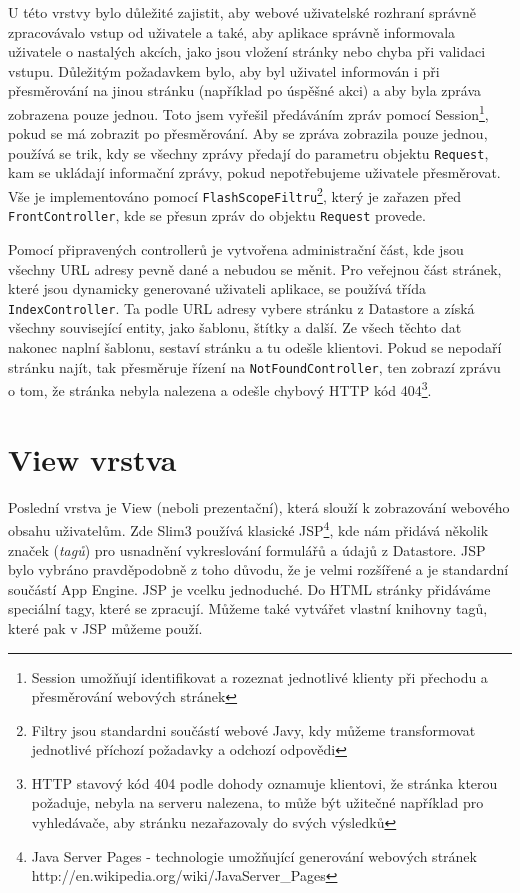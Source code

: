 U této vrstvy bylo důležité zajistit, aby webové uživatelské rozhraní správně zpracovávalo vstup od uživatele a také, aby aplikace správně informovala uživatele o nastalých akcích, jako jsou vložení stránky nebo chyba při validaci vstupu. Důležitým požadavkem bylo, aby byl uživatel informován i při přesměrování na jinou stránku (například po úspěšné akci) a aby byla zpráva zobrazena pouze jednou. Toto jsem vyřešil předáváním zpráv pomocí Session\footnote{Session umožňují identifikovat a rozeznat jednotlivé klienty při přechodu a přesměrování webových stránek}, pokud se má zobrazit po přesměrování. Aby se zpráva zobrazila pouze jednou, používá se trik, kdy se všechny zprávy předají do parametru objektu \verb|Request|, kam se ukládají informační zprávy, pokud nepotřebujeme uživatele přesměrovat. Vše je implementováno pomocí \verb|FlashScopeFiltru|\footnote{Filtry jsou standardni součástí webové Javy, kdy můžeme transformovat jednotlivé příchozí požadavky a odchozí odpovědi}, který je zařazen před \verb|FrontController|, kde se přesun zpráv do objektu \verb|Request| provede.

Pomocí připravených controllerů je vytvořena administrační část, kde jsou všechny URL adresy pevně dané a nebudou se měnit. Pro veřejnou část stránek, které jsou dynamicky generované uživateli aplikace, se používá třída \verb|IndexController|. Ta podle URL adresy vybere stránku z Datastore a získá všechny související entity, jako šablonu, štítky a další. Ze všech těchto dat nakonec naplní šablonu, sestaví stránku a tu odešle klientovi. Pokud se nepodaří stránku najít, tak přesměruje řízení na \verb|NotFoundController|, ten zobrazí zprávu o tom, že stránka nebyla nalezena a odešle chybový HTTP kód 404\footnote{HTTP stavový kód 404 podle dohody oznamuje klientovi, že stránka kterou požaduje, nebyla na serveru nalezena, to může být užitečné například pro vyhledávače, aby stránku nezařazovaly do svých výsledků}.

\section{View vrstva}
Poslední vrstva je View (neboli prezentační), která slouží k zobrazování webového obsahu uživatelům. Zde Slim3 používá klasické JSP\footnote{Java Server Pages - technologie umožňující generování webových stránek http://en.wikipedia.org/wiki/JavaServer\_Pages}, kde nám přidává několik značek (\emph{tagů}) pro usnadnění vykreslování formulářů a údajů z Datastore. JSP bylo vybráno pravděpodobně z toho důvodu, že je velmi rozšířené a je standardní součástí App Engine. JSP je vcelku jednoduché. Do HTML stránky přidáváme speciální tagy, které se zpracují. Můžeme také vytvářet vlastní knihovny tagů, které pak v JSP můžeme použí.

